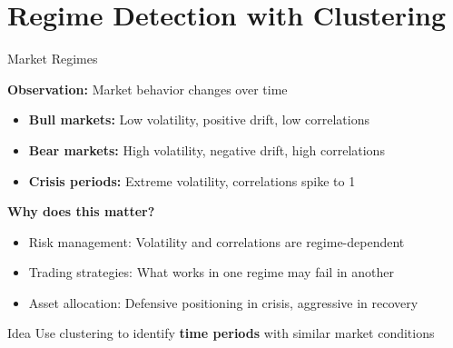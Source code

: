 \documentclass[10pt]{beamer}
\newcommand{\highlight}[1]{\textcolor{AccentOrange}{\textbf{#1}}}
\begin{document}
\section{Regime Detection with Clustering}

\begin{frame}{Market Regimes}

  \textbf{Observation:} Market behavior changes over time

  \vspace{0.5em}
  \begin{itemize}
    \item \textbf{Bull markets:} Low volatility, positive drift, low correlations
    \item \textbf{Bear markets:} High volatility, negative drift, high correlations
    \item \textbf{Crisis periods:} Extreme volatility, correlations spike to 1
  \end{itemize}

  \vspace{1em}
  \textbf{Why does this matter?}
  \begin{itemize}
    \item Risk management: Volatility and correlations are regime-dependent
    \item Trading strategies: What works in one regime may fail in another
    \item Asset allocation: Defensive positioning in crisis, aggressive in recovery
  \end{itemize}

  \vspace{0.5em}
  \begin{block}{Idea}
    Use clustering to identify \highlight{time periods} with similar market conditions
  \end{block}
\end{frame}

\end{document}
